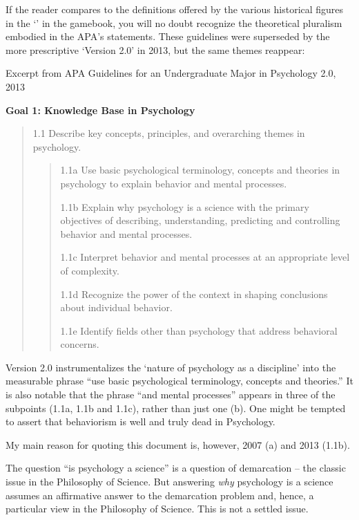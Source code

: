 \begin{refsection}
If the reader compares to the definitions offered by the various historical figures in the ‘’ in the gamebook, you will no doubt recognize the theoretical pluralism embodied in the APA's statements. These guidelines were superseded by the more prescriptive ‘Version 2.0’ in 2013, but the same themes reappear:

\begin{apatextbox}{Excerpt from APA Guidelines for an Undergraduate Major in Psychology 2.0, 2013}

\textbf{Goal 1: Knowledge Base in Psychology}

\begin{quote}

1.1 Describe key concepts, principles, and overarching themes in psychology.

\begin{quote}

1.1a Use basic psychological terminology, concepts and theories in psychology to explain behavior and mental processes.

1.1b Explain why psychology is a science with the primary objectives of describing, understanding, predicting and controlling behavior and mental processes.

1.1c Interpret behavior and mental processes at an appropriate level of complexity.

1.1d Recognize the power of the context in shaping conclusions about individual behavior.

1.1e Identify fields other than psychology that address behavioral concerns.
\end{quote}
\end{quote}

\label{excerptfromapaguidelinesforanundergraduatemajorinpsychology2.02013}
\end{apatextbox}

Version 2.0 instrumentalizes the ‘nature of psychology as a discipline’ into the measurable phrase ``use basic psychological terminology, concepts and theories.'' It is also notable that the phrase “and mental processes” appears in three of the subpoints (1.1a, 1.1b and 1.1c), rather than just one (b). One might be tempted to assert that behaviorism is well and truly dead in Psychology. 

My main reason for quoting this document is, however, 2007 (a) and 2013 (1.1b).

The question “is psychology a science” is a question of demarcation – the classic issue in the Philosophy of Science. But answering \emph{why} psychology is a science assumes an affirmative answer to the demarcation problem and, hence, a particular view in the Philosophy of Science. This is not a settled issue.


\end{refsection}
